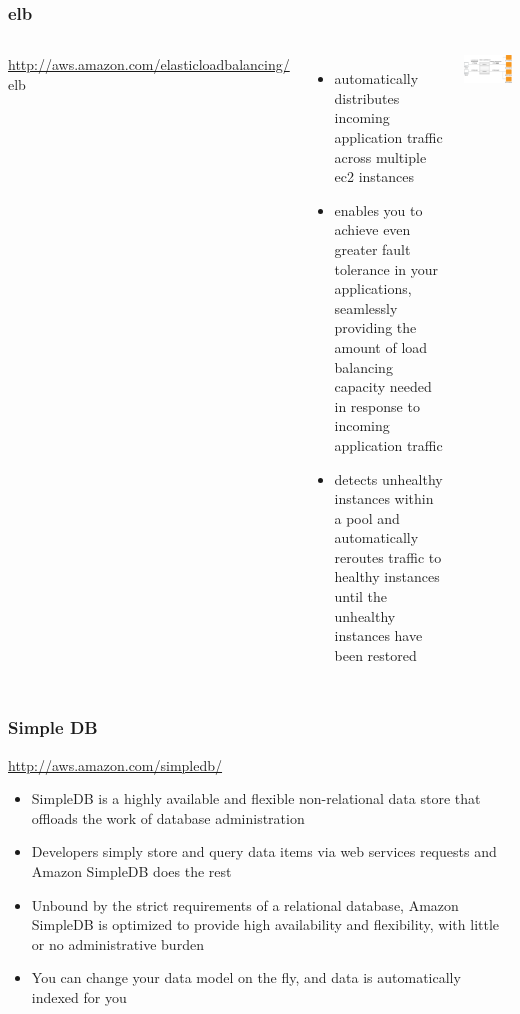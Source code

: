 \documentclass{beamer}
\begin{document}
\begin{frame}
\frametitle[\gls{elb}]{\acrfull{elb}}

\begin{columns}
\url{http://aws.amazon.com/elasticloadbalancing/}
\gls{elb}
\begin{itemize}
  \item automatically distributes incoming application traffic across multiple \gls{ec2} instances
  \item enables you to achieve even greater fault tolerance in your applications, seamlessly providing the amount of load balancing capacity needed in response to incoming application traffic
  \item detects unhealthy instances within a pool and automatically reroutes traffic to healthy instances until the unhealthy instances have been restored
\end{itemize}
\includegraphics[width=1.0 \textwidth]{elb-listeners.png}
\end{columns}

\end{frame}
\begin{frame}
\frametitle[Simple DB]{Simple DB}
\url{http://aws.amazon.com/simpledb/}

\begin{itemize}
  \item SimpleDB is a highly available and flexible non-relational data store that offloads the work of database administration
  \item Developers simply store and query data items via web services requests and Amazon SimpleDB does the rest
  \item Unbound by the strict requirements of a relational database, Amazon SimpleDB is optimized to provide high availability and flexibility, with little or no administrative burden
  \item You can change your data model on the fly, and data is automatically indexed for you
\end{itemize}
\end{frame}
\end{document}
